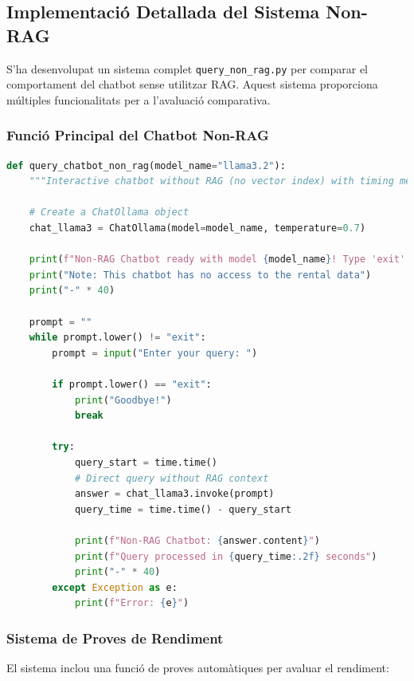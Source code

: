 \documentclass[12pt,a4paper]{article}
\begin{document}
\subsection{Implementació Detallada del Sistema Non-RAG}

S'ha desenvolupat un sistema complet \texttt{query\_non\_rag.py} per comparar el comportament del chatbot sense utilitzar RAG. Aquest sistema proporciona múltiples funcionalitats per a l'avaluació comparativa.

\subsubsection{Funció Principal del Chatbot Non-RAG}

\begin{lstlisting}[language=Python,caption=Chatbot interactiu Non-RAG amb mesures de rendiment]
def query_chatbot_non_rag(model_name="llama3.2"):
    """Interactive chatbot without RAG (no vector index) with timing measurements"""
    
    # Create a ChatOllama object
    chat_llama3 = ChatOllama(model=model_name, temperature=0.7)
    
    print(f"Non-RAG Chatbot ready with model {model_name}! Type 'exit' to quit.")
    print("Note: This chatbot has no access to the rental data")
    print("-" * 40)
    
    prompt = ""
    while prompt.lower() != "exit":
        prompt = input("Enter your query: ")
        
        if prompt.lower() == "exit":
            print("Goodbye!")
            break
            
        try:
            query_start = time.time()
            # Direct query without RAG context
            answer = chat_llama3.invoke(prompt)
            query_time = time.time() - query_start
            
            print(f"Non-RAG Chatbot: {answer.content}")
            print(f"Query processed in {query_time:.2f} seconds")
            print("-" * 40)
        except Exception as e:
            print(f"Error: {e}")
\end{lstlisting}

\subsubsection{Sistema de Proves de Rendiment}

El sistema inclou una funció de proves automàtiques per avaluar el rendiment:
\end{document}
